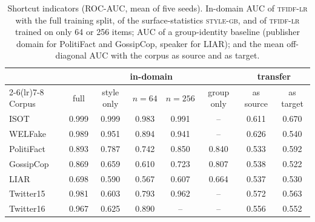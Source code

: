 \begin{table}[t]
\centering
\caption{Shortcut indicators (ROC-AUC, mean of five seeds). In-domain AUC of \textsc{tfidf-lr} with the full training split, of the surface-statistics \textsc{style-gb}, and of \textsc{tfidf-lr} trained on only 64 or 256 items; AUC of a group-identity baseline (publisher domain for PolitiFact and GossipCop, speaker for LIAR); and the mean off-diagonal AUC with the corpus as source and as target.}\label{tab:shortcuts}
\small
\begin{tabular}{@{}lccccccc@{}}
\toprule
 & \multicolumn{5}{c}{in-domain} & \multicolumn{2}{c}{transfer} \\
\cmidrule(lr){2-6}\cmidrule(lr){7-8}
Corpus & full & style only & $n=64$ & $n=256$ & group only & as source & as target \\
\midrule
ISOT & 0.999 & 0.999 & 0.983 & 0.991 & -- & 0.611 & 0.670 \\
WELFake & 0.989 & 0.951 & 0.894 & 0.941 & -- & 0.626 & 0.540 \\
PolitiFact & 0.893 & 0.787 & 0.742 & 0.850 & 0.840 & 0.533 & 0.592 \\
GossipCop & 0.869 & 0.659 & 0.610 & 0.723 & 0.807 & 0.538 & 0.522 \\
LIAR & 0.698 & 0.590 & 0.567 & 0.607 & 0.664 & 0.537 & 0.530 \\
Twitter15 & 0.981 & 0.603 & 0.793 & 0.962 & -- & 0.572 & 0.563 \\
Twitter16 & 0.967 & 0.625 & 0.890 & -- & -- & 0.556 & 0.552 \\
\bottomrule
\end{tabular}
\end{table}

